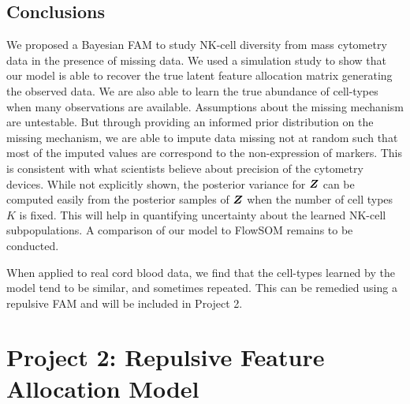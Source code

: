 \documentclass[12pt,]{article}
\newcommand{\bZ}{\mbox{\boldmath $Z$}}
\begin{document}
\subsection{Conclusions}\label{sec:CB-conc}


We proposed a Bayesian FAM to study NK-cell
diversity from mass cytometry data in the presence of missing data. We used a
simulation study to show that our model is able to recover the true latent
feature allocation matrix generating the observed data. We are also able to
learn the true abundance of cell-types when many observations are available. 
%
Assumptions about the missing mechanism are untestable. But through providing
an informed prior distribution on the missing mechanism, we are able to impute
data missing not at random such that most of the imputed values are correspond
to the non-expression of markers. This is consistent with what scientists
believe about precision of the cytometry devices.
%
While not explicitly shown, the posterior variance for $\bZ$ can be computed
easily from the posterior samples of $\bZ$ when the number of cell types $K$ is
fixed. This will help in quantifying uncertainty about the learned NK-cell
subpopulations. 
%
A comparison of our model to FlowSOM remains to be conducted. 
%

When applied to real cord blood data, we find that the cell-types learned by
the model tend to be similar, and sometimes repeated. This can be remedied
using a repulsive FAM and will be included in Project 2.





\section{Project 2: Repulsive Feature Allocation Model}\label{sec:proj2}
\end{document}
